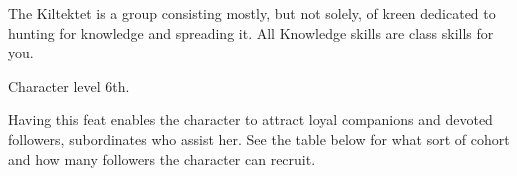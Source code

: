 {The Kiltektet is a group consisting mostly, but not solely, of kreen dedicated to hunting for knowledge and spreading it.}{}
{All Knowledge skills are class skills for you.}{}{}

{Character level 6th.}
{Having this feat enables the character to attract loyal companions and devoted followers, subordinates who assist her. See the table below for what sort of cohort and how many followers the character can recruit.

}
